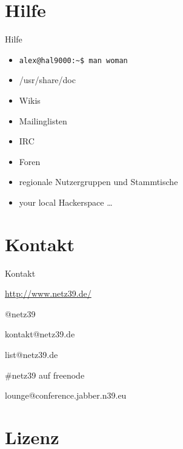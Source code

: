 \documentclass{beamer}
\begin{document}
\section{Hilfe}

\frame{\tableofcontents[currentsection]}

\begin{frame}{Hilfe}
    \begin{itemize}
        \item \texttt{alex@hal9000:\textasciitilde\$ man woman}
        \item /usr/share/doc
        \item Wikis
        \item Mailinglisten
        \item IRC
        \item Foren
        \item regionale Nutzergruppen und Stammtische
        \item your local Hackerspace …
    \end{itemize}
\end{frame}

\section{Kontakt}

\begin{frame}{Kontakt}
    \begin{center}
        \begin{description}
            \item[WWW] \url{http://www.netz39.de/}
            \item[Twitter] @netz39
            \item[E-Mail] kontakt@netz39.de
            \item[Mailingliste] list@netz39.de
            \item[IRC] \#netz39 auf freenode
            \item[XMPP MUC] lounge@conference.jabber.n39.eu
        \end{description}
    \end{center}
\end{frame}

\appendix

\section{Lizenz}
\end{document}

